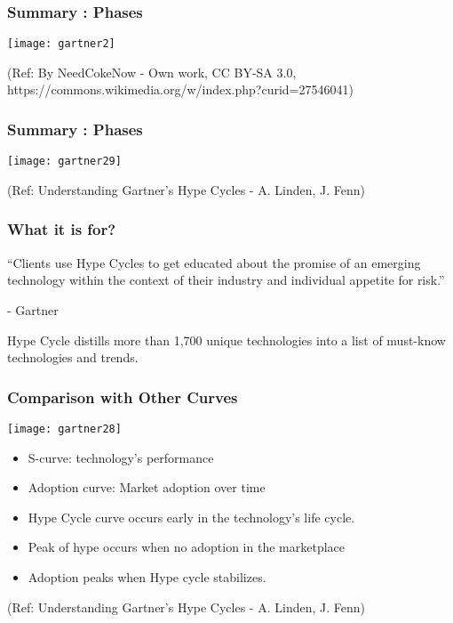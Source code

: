 \begin{frame}[fragile]\frametitle{Summary : Phases}

\begin{center}
\texttt{[image: gartner2]}
\end{center}

{\tiny (Ref: By NeedCokeNow - Own work, CC BY-SA 3.0, https://commons.wikimedia.org/w/index.php?curid=27546041)}
\end{frame}

\begin{frame}[fragile]\frametitle{Summary : Phases}

\begin{center}
\texttt{[image: gartner29]}
\end{center}

{\tiny (Ref: Understanding Gartner's Hype Cycles - A. Linden, J. Fenn)}
\end{frame}

\begin{frame}[fragile]\frametitle{What it is for?}

``Clients use Hype Cycles to get educated about the promise of an emerging technology within the context of their industry and individual appetite for risk.''

- Gartner 

Hype Cycle distills more than 1,700 unique technologies into a list of must-know technologies and trends.

\end{frame}


\begin{frame}[fragile]\frametitle{Comparison with Other Curves}

\begin{center}
\texttt{[image: gartner28]}
\end{center}

\begin{itemize}
\item  S-curve: technology's performance
\item  Adoption curve: Market adoption over time 
\item Hype Cycle curve  occurs early in the technology's life cycle. 
\item Peak of hype occurs when no adoption in the marketplace 
\item Adoption peaks when Hype cycle stabilizes.
\end{itemize}

{\tiny (Ref: Understanding Gartner's Hype Cycles - A. Linden, J. Fenn)}
\end{frame}



